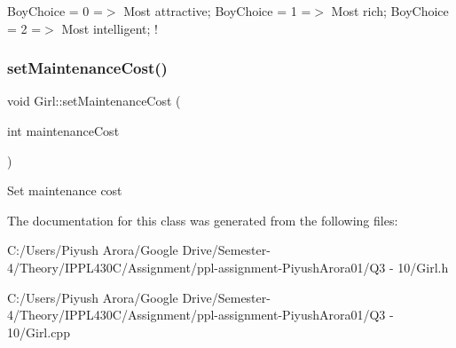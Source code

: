 Boy\+Choice = 0 =$>$ Most attractive; Boy\+Choice = 1 =$>$ Most rich; Boy\+Choice = 2 =$>$ Most intelligent; ! \mbox{\label{class_girl_a585d7b2bbaec1d608e64fd29138e4632}} 
\subsubsection{\texorpdfstring{set\+Maintenance\+Cost()}{setMaintenanceCost()}}
{\footnotesize\ttfamily void Girl\+::set\+Maintenance\+Cost (\begin{DoxyParamCaption}\item[{int}]{maintenance\+Cost }\end{DoxyParamCaption})}

Set maintenance cost 

The documentation for this class was generated from the following files\+:\begin{DoxyCompactItemize}
\item 
C\+:/\+Users/\+Piyush Arora/\+Google Drive/\+Semester-\/4/\+Theory/\+I\+P\+P\+L430\+C/\+Assignment/ppl-\/assignment-\/\+Piyush\+Arora01/\+Q3 -\/ 10/Girl.\+h\item 
C\+:/\+Users/\+Piyush Arora/\+Google Drive/\+Semester-\/4/\+Theory/\+I\+P\+P\+L430\+C/\+Assignment/ppl-\/assignment-\/\+Piyush\+Arora01/\+Q3 -\/ 10/Girl.\+cpp\end{DoxyCompactItemize}
